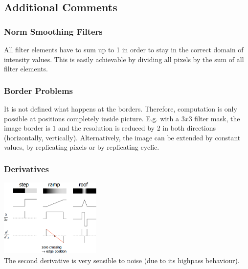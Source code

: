\begin{minipage}{12cm}
  \subsection{Additional Comments}
    \subsubsection{Norm Smoothing Filters}
    All filter elements have to sum up to 1 in order to stay in the correct domain of intensity values.
    This is easily achievable by dividing all pixels by the sum of all filter elements.
    
    \subsubsection{Border Problems}
    It is not defined what happens at the borders. Therefore, computation is only possible at positions 
    completely inside picture. E.g. with a $3x3$ filter mask, the image border is $1$ and the resolution 
    is reduced by 2 in both directions (horizontally, vertically). Alternatively, the image can be 
    extended by constant values, by replicating pixels or by replicating cyclic.
\end{minipage}
\hspace{0.5cm}
\begin{minipage}{6.5cm}
\subsubsection{Derivatives}
  \includegraphics[width=5cm]{./images/derivatives.png}\\
  The second derivative is very sensible to noise (due to its highpass behaviour).
\end{minipage}
